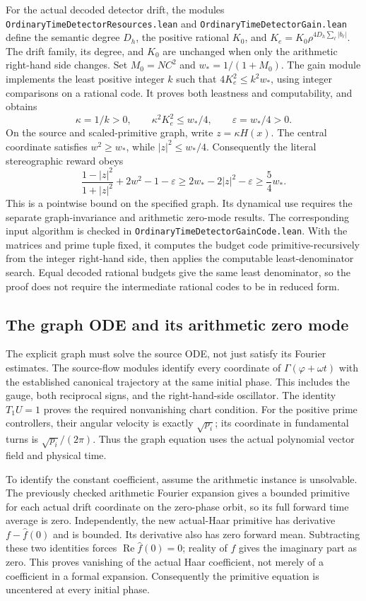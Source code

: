 \documentclass[11pt]{article}
\newcommand{\code}[1]{{\small\nolinkurl{#1}}}
\begin{document}
For the actual decoded detector drift, the modules
\code{OrdinaryTimeDetectorResources.lean} and
\code{OrdinaryTimeDetectorGain.lean} define the semantic degree $D_h$,
the positive rational $K_0$, and
$K_e=K_0\rho^{4D_h\sum_\ell|b_\ell|}$. The drift family, its degree,
and $K_0$ are unchanged when only the arithmetic right-hand side changes.
Set $M_0=NC^2$ and $w_*=1/(1+M_0)$. The gain module implements the
least positive integer $k$ such that $4K_e^2\le k^2w_*$, using integer
comparisons on a rational code. It proves both leastness and
computability, and obtains
\[
 \kappa=1/k>0,\qquad
 \kappa^2K_e^2\le w_*/4,\qquad \varepsilon=w_*/4>0.
\]
On the source and scaled-primitive graph, write $z=\kappa H(x)$.
The central coordinate satisfies $w^2\ge w_*$, while
$|z|^2\le w_*/4$. Consequently the literal stereographic reward obeys
\[
 \frac{1-|z|^2}{1+|z|^2}+2w^2-1-\varepsilon
 \ge 2w_*-2|z|^2-\varepsilon
 \ge\frac54 w_*.
\]
This is a pointwise bound on the specified graph. Its dynamical use
requires the separate graph-invariance and arithmetic zero-mode results.
The corresponding input algorithm is checked in
\code{OrdinaryTimeDetectorGainCode.lean}. With the matrices and prime tuple
fixed, it computes the budget code primitive-recursively from the integer
right-hand side, then applies the computable least-denominator search.
Equal decoded rational budgets give the same least denominator, so the
proof does not require the intermediate rational codes to be in reduced form.

\subsection{The graph ODE and its arithmetic zero mode}

The explicit graph must solve the source ODE, not just satisfy its
Fourier estimates. The source-flow modules identify every coordinate of
$\Gamma(\varphi+\omega t)$ with the established canonical trajectory at
the same initial phase. This includes the gauge, both reciprocal signs,
and the right-hand-side oscillator. The identity $T_1U=1$ proves the
required nonvanishing chart condition. For the positive prime controllers,
their angular velocity is exactly $\sqrt{p_i}$; its coordinate in
fundamental turns is $\sqrt{p_i}/(2\pi)$. Thus the graph equation uses the
actual polynomial vector field and physical time.

To identify the constant coefficient, assume the arithmetic instance is
unsolvable. The previously checked arithmetic Fourier expansion gives a
bounded primitive for each actual drift coordinate on the zero-phase
orbit, so its full forward time average is zero. Independently, the new
actual-Haar primitive has derivative $f-\widehat f(0)$ and is bounded.
Its derivative also has zero forward mean. Subtracting these two
identities forces $\operatorname{Re}\widehat f(0)=0$; reality of $f$
gives the imaginary part as zero. This proves vanishing of the actual
Haar coefficient, not merely of a coefficient in a formal expansion.
Consequently the primitive equation is uncentered at every initial phase.
\end{document}
